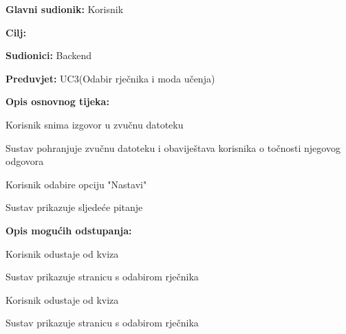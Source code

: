 					\noindent {}
					\begin{packed_item}
						
						\item \textbf{Glavni sudionik: } Korisnik
						\item  \textbf{Cilj:} 
						\item  \textbf{Sudionici:} Backend
						\item  \textbf{Preduvjet:} UC3(Odabir rječnika i moda učenja)
						\item  \textbf{Opis osnovnog tijeka:}
						
						\item[] \begin{packed_enum}
							
							\item Korisnik snima izgovor u zvučnu datoteku
							\item Sustav pohranjuje zvučnu datoteku i obaviještava korisnika o točnosti njegovog odgovora
							\item Korisnik odabire opciju "Nastavi"
							\item Sustav prikazuje sljedeće pitanje
						\end{packed_enum}
						
						\item  \textbf{Opis mogućih odstupanja:}
						
						\item[] \begin{packed_item}
							
							\item[3.a] Korisnik odustaje od kviza
							\item[] \begin{packed_enum}
								
								\item Sustav prikazuje stranicu s odabirom rječnika
								
							\end{packed_enum}
							
							\item[4.a] Korisnik odustaje od kviza 
							\item[] \begin{packed_enum}
								
								\item Sustav prikazuje stranicu s odabirom rječnika
								
							\end{packed_enum}
							
						\end{packed_item}
					\end{packed_item}
					

